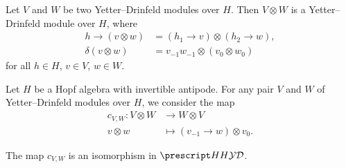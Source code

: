 \begin{exercise}\label{xca:YD_tensor}
Let $V$ and $W$ be two Yetter--Drinfeld modules over $H$. Then $V\otimes W$ is a
Yetter--Drinfeld module over $H$, where 
\begin{align*}
h\rightarrow(v\otimes w) & =(h_{1}\rightarrow v)\otimes(h_{2}\rightarrow w),\\
\delta(v\otimes w) & =v_{-1}w_{-1}\otimes(v_{0}\otimes w_{0})
\end{align*}
for all $h\in H$, $v\in V$, $w\in W$.
\end{exercise}

Let $H$ be a Hopf algebra with invertible antipode. For any pair $V$ and $W$ of
Yetter--Drinfeld modules over $H$, we consider the map 
\begin{align*}
c_{V,W}\colon V\otimes W&\to W\otimes V\\
v\otimes w&\mapsto (v_{-1}\rightarrow w)\otimes v_{0}.
\end{align*}

\begin{proposition}
The map $c_{V,W}$ is an isomorphism in $\ydH$.
\end{proposition}

